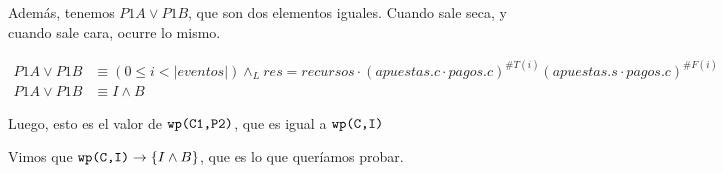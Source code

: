 \documentclass[../document.tex]{subfiles}
\begin{document}
Además, tenemos $P1A \lor P1B$, que son dos elementos iguales. Cuando sale seca, y cuando sale cara, ocurre lo mismo. 

\begin{align*}
    P1A \lor P1B &\equiv
    (0\leq i < |eventos|)\land_{L}
    res = recursos \cdot (apuestas.c\cdot pagos.c)^{\#T(i)}(apuestas.s\cdot pagos.c)^{\#F(i)}\\
    P1A \lor P1B &\equiv I \land B
\end{align*}

Luego, esto es el valor de $\verb+wp(C1,P2)+$, que es igual a $\verb+wp(C,I)+$

Vimos que $\verb+wp(C,I)+ \to \{I \land B\}$, que es lo que queríamos probar.
\end{document}
